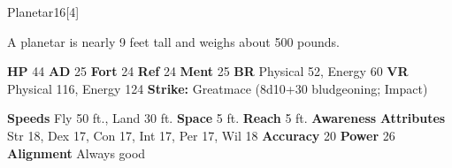   \begin{monsubsection}{Planetar}{16}[4]
    \vspace{-1em}\vspace{-1em}
    \vspace{0em}

    
          A planetar is nearly 9 feet tall and weighs about 500 pounds.
        

    \begin{spellcontent}
      \begin{spelltargetinginfo}
        \pari \textbf{HP} 44 \monsep
          \textbf{AD} 25 \monsep
          \textbf{Fort} 24 \monsep
          \textbf{Ref} 24 \monsep
          \textbf{Ment} 25
        \pari \textbf{BR} Physical 52, Energy 60 \monsep
        \textbf{VR} Physical 116, Energy 124
        \pari \textbf{Strike:}
            Greatmace  (8d10+30 bludgeoning; Impact)
      \end{spelltargetinginfo}
    \end{spellcontent}
    \begin{monsterfooter}
      \pari \textbf{Speeds} Fly 50 ft., Land 30 ft. \monsep
        \textbf{Space} 5 ft. \monsep
        \textbf{Reach} 5 ft.
      \pari \textbf{Awareness} 
      \pari \textbf{Attributes}
        Str 18, Dex 17,
        Con 17, Int 17,
        Per 17, Wil 18
      \pari \textbf{Accuracy} 20 \monsep
        \textbf{Power} 26
      \pari \textbf{Alignment} Always good
    \end{monsterfooter}
  \end{monsubsection}
  
  

